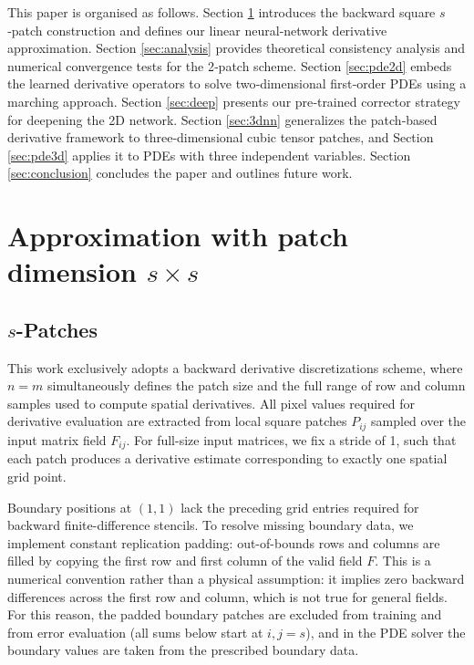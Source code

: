 \documentclass[pdflatex,sn-mathphys-num]{sn-jnl}%
\newcommand{\rev}[1]{\textcolor{red}{#1}}
\theoremstyle{thmstyleone}%
\theoremstyle{thmstyletwo}%
\theoremstyle{thmstylethree}%
\begin{document}
This paper is organised as follows. Section \ref{sec:4} introduces the backward square $s$‑patch construction and defines our linear neural‑network derivative approximation. Section \rev{\ref{sec:analysis}} provides theoretical consistency analysis and numerical convergence tests for the 2‑patch scheme. Section \rev{\ref{sec:pde2d}} embeds the learned derivative operators to solve two‑dimensional first‑order PDEs using a marching approach. Section \rev{\ref{sec:deep}} presents our pre‑trained corrector strategy for deepening the 2D network. Section \ref{sec:3dnn} generalizes the patch‑based derivative framework to three‑dimensional cubic tensor patches, and Section \ref{sec:pde3d} applies it to PDEs with three independent variables. Section \ref{sec:conclusion} concludes the paper and outlines future work.

\section{Approximation with patch dimension $s\times s$}\label{sec:4}
\subsection{$s$-Patches}
This work exclusively adopts a backward derivative discretizations scheme, where $n=m$ simultaneously defines the patch size and the full range of row and column samples used to compute spatial derivatives. All pixel values required for derivative evaluation are extracted from local square patches $P_{ij}$ sampled over the input matrix field $F_{ij}$. For full-size input matrices, we fix a stride of 1, such that each patch produces a derivative estimate corresponding to exactly one spatial grid point.

Boundary positions at $(1,1)$ lack the preceding grid entries required for backward finite-difference stencils. To resolve missing boundary data, we implement constant replication padding: out-of-bounds rows and columns are filled by copying the first row and first column of the valid field $F$. This is a numerical convention rather than a physical assumption: it implies zero backward differences across the first row and column, which is not true for general fields. For this reason, the padded boundary patches are excluded from training and from error evaluation (all sums below start at $i,j=s$), and in the PDE solver the boundary values are taken from the prescribed boundary data.
\end{document}
